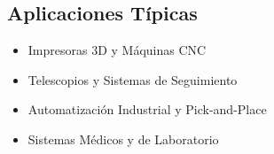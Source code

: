 \subsection{Aplicaciones Típicas}
\begin{itemize}
    \item Impresoras 3D y Máquinas CNC
    \item Telescopios y Sistemas de Seguimiento
    \item Automatización Industrial y Pick-and-Place
    \item Sistemas Médicos y de Laboratorio
\end{itemize}
